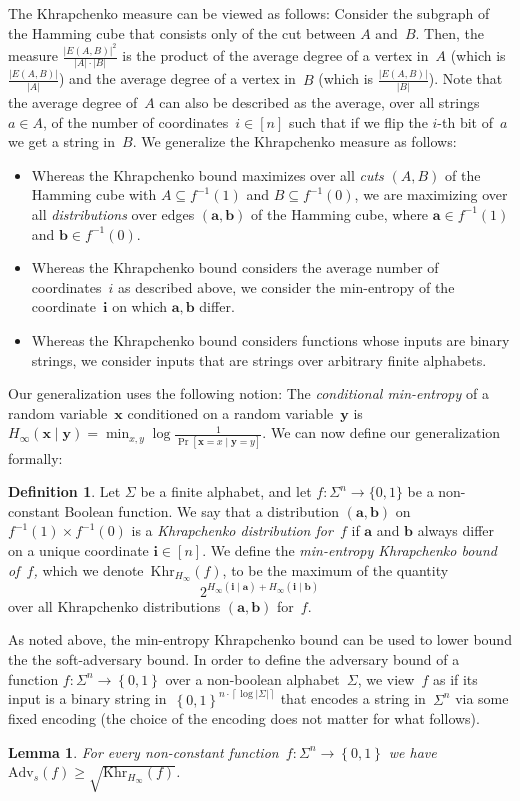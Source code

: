 \documentclass[11pt]{article}
\numberwithin{equation}{section}
\newtheorem{lemma}[theorem]{Lemma}
\theoremstyle{definition}
\newtheorem{definition}[theorem]{Definition}
\theoremstyle{plain}
\theoremstyle{definition}\newtheorem{notation}[theorem]{Notation}\theoremstyle{plain}
\newcommand{\B}{\left\{ 0,1 \right \}}
\renewcommand{\a}{\boldsymbol{a}}
\renewcommand{\b}{\boldsymbol{b}}
\renewcommand{\i}{\boldsymbol{i}}
\newcommand{\x}{\boldsymbol{x}}
\newcommand{\y}{\boldsymbol{y}}
\newcommand{\Hm}{H_{\infty}}
\newcommand{\K}{\mathrm{Khr}}
\newcommand{\Km}{\K_{\Hm}}
\newcommand{\Am}{\mathrm{Adv}_{s}}
\theoremstyle{definition}
\theoremstyle{plain}
\begin{document}
The Khrapchenko measure can be viewed as follows: Consider the subgraph
of the Hamming cube that consists only of the cut between $A$ and~$B$.
Then, the measure $\frac{\left|E(A,B)\right|^{2}}{\left|A\right|\cdot\left|B\right|}$
is the product of the average degree of a vertex in~$A$ (which is
$\frac{\left|E(A,B)\right|}{\left|A\right|}$) and the average degree
of a vertex in~$B$ (which is $\frac{\left|E(A,B)\right|}{\left|B\right|}$).
Note that the average degree of~$A$ can also be described as the
average, over all strings~$a\in A$, of the number of coordinates~$i\in\left[n\right]$
such that if we flip the $i$-th bit of~$a$ we get a string in~$B$.
We generalize the Khrapchenko measure as follows: 
\begin{itemize}
\item Whereas the Khrapchenko bound maximizes over all \emph{cuts} $(A,B)$
of the Hamming cube with $A\subseteq f^{-1}(1)$ and $B\subseteq f^{-1}(0)$,
we are maximizing over all \emph{distributions} over edges $(\a,\b)$
of the Hamming cube, where $\a\in f^{-1}(1)$ and $\b\in f^{-1}(0)$. 
\item Whereas the Khrapchenko bound considers the average number of coordinates~$i$
as described above, we consider the min-entropy of the coordinate~$\i$
on which $\a,\b$ differ.
\item Whereas the Khrapchenko bound considers functions whose inputs are
binary strings, we consider inputs that are strings over arbitrary
finite alphabets. 
\end{itemize}
Our generalization uses the following notion: The \emph{conditional
min-entropy} of a random variable~$\x$ conditioned on a random variable~$\y$
is $\Hm(\x\mid\y)=\min_{x,y}\log\frac{1}{\Pr[\x=x\mid\y=y]}.$ We
can now define our generalization formally: 
\begin{definition}
\label{def:min-entropy-khrapchenko}Let $\Sigma$ be a finite alphabet,
and let $f\colon\Sigma^{n}\to\{0,1\}$ be a non-constant Boolean function.
We say that a distribution $(\a,\b)$ on $f^{-1}(1)\times f^{-1}(0)$
is a \emph{Khrapchenko distribution for~$f$} if $\a$ and $\b$
always differ on a unique coordinate $\i\in\left[n\right]$. We define
%
the \emph{min-entropy Khrapchenko bound of~$f$,} which we denote~$\Km(f)$,
to be the maximum of the quantity 
\[
2^{\Hm(\i\mid\a)+\Hm(\i\mid\b)}
\]
over all Khrapchenko distributions $(\a,\b)$ for~$f$. 
\end{definition}

As noted above, the min-entropy Khrapchenko bound can be used to lower
bound the the soft-adversary bound. In order to define the adversary
bound of a function $f\colon\Sigma^{n}\to\B$ over a non-boolean alphabet~$\Sigma$,
we view~$f$ as if its input is a binary string in~$\B^{n\cdot\left\lceil \log\left|\Sigma\right|\right\rceil }$
that encodes a string in~$\Sigma^{n}$ via some fixed encoding (the
choice of the encoding does not matter for what follows).
\begin{lemma}
%
\label{lemma:Khr-Amb}For every non-constant function~$f\colon \Sigma^{n}\to\B$
we have $\Am(f)\geq\sqrt{\Km(f)}$. 
\end{lemma}
\end{document}
